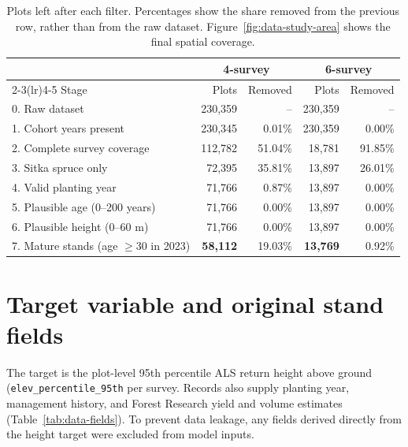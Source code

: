 \documentclass[logo,msc,ai]{infthesis}           %
\begin{document}
\begin{table}[!htbp]
\centering
\scriptsize
\begin{tabular}{lrrrr}
\toprule
& \multicolumn{2}{c}{4-survey} & \multicolumn{2}{c}{6-survey} \\
\cmidrule(lr){2-3}\cmidrule(lr){4-5}
Stage & Plots & Removed & Plots & Removed \\
\midrule
0. Raw dataset
& 230,359 & -- & 230,359 & -- \\
1. Cohort years present
& 230,345 & 0.01\% & 230,359 & 0.00\% \\
2. Complete survey coverage
& 112,782 & 51.04\% & 18,781 & 91.85\% \\
3. Sitka spruce only
& 72,395 & 35.81\% & 13,897 & 26.01\% \\
4. Valid planting year
& 71,766 & 0.87\% & 13,897 & 0.00\% \\
5. Plausible age (0--200 years)
& 71,766 & 0.00\% & 13,897 & 0.00\% \\
6. Plausible height (0--60 m)
& 71,766 & 0.00\% & 13,897 & 0.00\% \\
7. Mature stands (age $\geq 30$ in 2023)
& \textbf{58,112} & 19.03\%
& \textbf{13,769} & 0.92\% \\
\bottomrule
\end{tabular}
\caption{\small{Plots left after each filter. Percentages show the share removed from the previous row, rather than from the raw dataset. Figure~\ref{fig:data-study-area} shows the final spatial coverage.}}
\label{tab:data-cleaning-funnel}
\end{table}

\section{Target variable and original stand fields}
\label{sec:data-response}


The target is the plot-level 95th percentile ALS return height above ground (\texttt{elev\_\allowbreak percentile\_\allowbreak 95th} per survey. Records also supply planting year, management history, and Forest Research yield and volume estimates (Table~\ref{tab:data-fields}). To prevent data leakage, any fields derived directly from the height target were excluded from model inputs.
\end{document}
